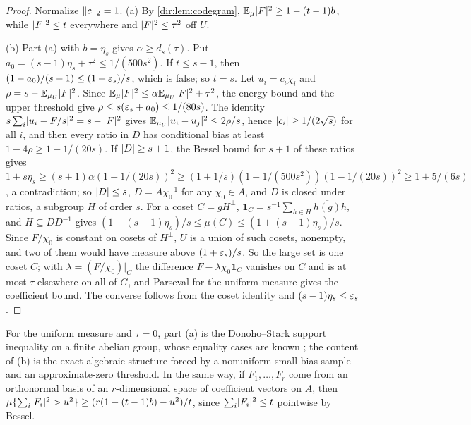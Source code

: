 \begin{proof}
Normalize $\lVert c\rVert_2=1$. (a) By \cref{dir:lem:codegram}, $\mathbb{E}_\mu\lvert F\rvert^2\ge1-(t-1)b$, while $\lvert F\rvert^2\le t$
everywhere and $\lvert F\rvert^2\le\tau^2$ off $U$.

(b) Part (a) with $b=\eta_s$ gives $\alpha\ge d_s(\tau)$. Put $a_0=(s-1)\eta_s+\tau^2\le1/(500s^2)$. If $t\le s-1$,
then $(1-a_0)/(s-1)\le(1+\varepsilon_s)/s$, which is false; so $t=s$. Let $u_i=c_i\chi_i$ and
$\rho=s-\mathbb{E}_{\mu_U}\lvert F\rvert^2$. Since $\mathbb{E}_\mu\lvert F\rvert^2\le\alpha\mathbb{E}_{\mu_U}\lvert F\rvert^2+\tau^2$, the energy bound and
the upper threshold give $\rho\le s(\varepsilon_s+a_0)\le1/(80s)$. The identity
$s\sum_i\lvert u_i-F/s\rvert^2=s-\lvert F\rvert^2$ gives $\mathbb{E}_{\mu_U}\lvert u_i-u_j\rvert^2\le2\rho/s$, hence $\lvert c_i\rvert\ge1/(2\sqrt s)$
for all $i$, and then every ratio in $D$ has conditional bias at least $1-4\rho\ge1-1/(20s)$. If
$\lvert D\rvert\ge s+1$, the Bessel bound for $s+1$ of these ratios gives
$1+s\eta_s\ge(s+1)\alpha(1-1/(20s))^2\ge(1+1/s)(1-1/(500s^2))(1-1/(20s))^2\ge1+5/(6s)$, a contradiction; so
$\lvert D\rvert\le s$, $D=A\chi_0^{-1}$ for any $\chi_0\in A$, and $D$ is closed under ratios, a subgroup $H$ of order
$s$. For a coset $C=gH^\perp$, $\mathbf 1_C=s^{-1}\sum_{h\in H}\overline{h(g)}h$, and $H\subseteq DD^{-1}$ gives
$(1-(s-1)\eta_s)/s\le\mu(C)\le(1+(s-1)\eta_s)/s$. Since $F/\chi_0$ is constant on cosets of $H^\perp$, $U$ is a
union of such cosets, nonempty, and two of them would have measure above $(1+\varepsilon_s)/s$. So the large set
is one coset $C$; with $\lambda=(F/\chi_0)|_C$ the difference $F-\lambda\chi_0\mathbf 1_C$ vanishes on $C$ and is at
most $\tau$ elsewhere on all of $G$, and Parseval for the uniform measure gives the coefficient bound. The
converse follows from the coset identity and $(s-1)\eta_s\le\varepsilon_s$.
\end{proof}

For the uniform measure and $\tau=0$, part (a) is the Donoho--Stark support inequality on a finite
abelian group, whose equality cases are known \cite{DonohoStark1989Uncertainty,MatusiakOzaydinPrzebinda2004DonohoStark,Meshulam2006Uncertainty}; the content of (b) is the exact algebraic
structure forced by a nonuniform small-bias sample and an approximate-zero threshold. In the same way, if
$F_1,\dots,F_r$ come from an orthonormal basis of an $r$-dimensional space of coefficient vectors on $A$, then
$\mu\{\sum_i\lvert F_i\rvert^2>u^2\}\ge(r(1-(t-1)b)-u^2)/t$, since $\sum_i\lvert F_i\rvert^2\le t$ pointwise by Bessel.

